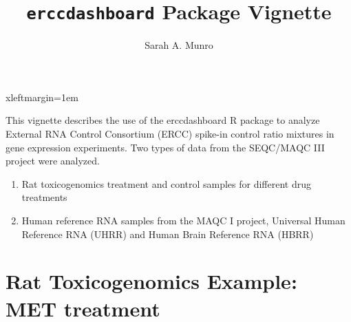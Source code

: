 \documentclass{article}
\begin{document}



 {xleftmargin=1em}
\renewenvironment{Schunk}{\vspace{\topsep}}{\vspace{\topsep}}
\title{{\tt erccdashboard} Package Vignette}
\author{Sarah A. Munro}
\maketitle

This vignette describes the use of the erccdashboard R package to analyze 
External RNA Control Consortium (ERCC) spike-in control ratio mixtures in gene
expression experiments. Two types of data from the SEQC/MAQC III project were 
analyzed.
\begin{enumerate}
  \item Rat toxicogenomics treatment and control samples for different drug 
  treatments
  \item Human reference RNA samples from the MAQC I project, Universal Human 
  Reference RNA (UHRR) and Human Brain Reference RNA (HBRR)
\end{enumerate}

\section{Rat Toxicogenomics Example: MET treatment}
\end{document}
